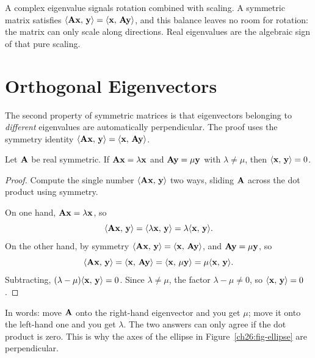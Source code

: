 \begin{intuitionbox}
A complex eigenvalue signals rotation combined with scaling. A symmetric
matrix satisfies $\langle \mathbf{A}\mathbf{x},\, \mathbf{y} \rangle = \langle \mathbf{x},\, \mathbf{A}\mathbf{y} \rangle$,
and this balance leaves no room for rotation: the matrix can only scale along
directions. Real eigenvalues are the algebraic sign of that pure scaling.
\end{intuitionbox}

\section{Orthogonal Eigenvectors}
\label{ch26:orthogonal-eigenvectors}

The second property of symmetric matrices is that
eigenvectors belonging to \emph{different} eigenvalues are automatically
perpendicular. The proof uses the symmetry identity
$\langle \mathbf{A}\mathbf{x},\, \mathbf{y} \rangle = \langle \mathbf{x},\, \mathbf{A}\mathbf{y} \rangle$.

\begin{theorem}
\label{ch26:thm-orthogonal}
Let $\mathbf{A}$ be real symmetric. If $\mathbf{A}\mathbf{x}=\lambda\mathbf{x}$ and
$\mathbf{A}\mathbf{y}=\mu\mathbf{y}$ with $\lambda\neq\mu$, then $\langle \mathbf{x},\, \mathbf{y} \rangle=0$.
\end{theorem}

\begin{proof}
Compute the single number $\langle \mathbf{A}\mathbf{x},\, \mathbf{y} \rangle$ two ways, sliding
$\mathbf{A}$ across the dot product using symmetry.

On one hand, $\mathbf{A}\mathbf{x}=\lambda\mathbf{x}$, so
\[
  \langle \mathbf{A}\mathbf{x},\, \mathbf{y} \rangle = \langle \lambda\mathbf{x},\, \mathbf{y} \rangle = \lambda\langle \mathbf{x},\, \mathbf{y} \rangle.
\]
On the other hand, by symmetry $\langle \mathbf{A}\mathbf{x},\, \mathbf{y} \rangle=\langle \mathbf{x},\, \mathbf{A}\mathbf{y} \rangle$,
and $\mathbf{A}\mathbf{y}=\mu\mathbf{y}$, so
\[
  \langle \mathbf{A}\mathbf{x},\, \mathbf{y} \rangle = \langle \mathbf{x},\, \mathbf{A}\mathbf{y} \rangle = \langle \mathbf{x},\, \mu\mathbf{y} \rangle = \mu\langle \mathbf{x},\, \mathbf{y} \rangle.
\]
Subtracting, $(\lambda-\mu)\langle \mathbf{x},\, \mathbf{y} \rangle = 0$. Since $\lambda\neq\mu$,
the factor $\lambda-\mu\neq 0$, so $\langle \mathbf{x},\, \mathbf{y} \rangle=0$.
\end{proof}

In words: move $\mathbf{A}$ onto the right-hand eigenvector and you get $\mu$; move
it onto the left-hand one and you get $\lambda$. The two answers can only agree
if the dot product is zero. This is why the axes of the ellipse in
Figure~\ref{ch26:fig-ellipse} are perpendicular.

